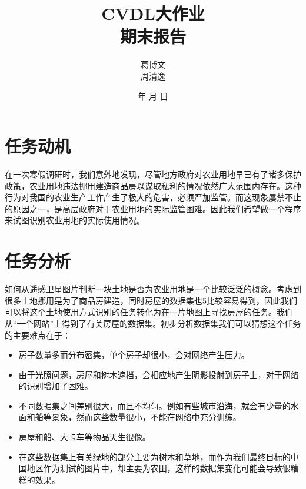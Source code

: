 \documentclass[a4paper,12pt]{article}
\renewcommand{\today}{\number\year 年 \number\month 月 \number\day 日}
\begin{document}
\begin{CJK*}{UTF8}{gbsn}

\title{\textbf{CVDL大作业\\期末报告}}
\author{葛博文\\周清逸}
\date{\today}
\maketitle

\begin{spacing}{1.2}

    \section{任务动机}
    在一次寒假调研时，我们意外地发现，尽管地方政府对农业用地早已有了诸多保护政策，农业用地违法挪用建造商品房以谋取私利的情况依然广大范围内存在。这种行为对我国的农业生产工作产生了极大的危害，必须严加监管。而这现象屡禁不止的原因之一，是高层政府对于农业用地的实际监管困难。因此我们希望做一个程序来试图识别农业用地的实际使用情况。


    \section{任务分析}
    如何从遥感卫星图片判断一块土地是否为农业用地是一个比较泛泛的概念。考虑到很多土地挪用是为了商品房建造，同时房屋的数据集也5比较容易得到，因此我们可以将这个土地使用方式识别的任务转化为在一片地图上寻找房屋的任务。我们从“一个网站”上得到了有关房屋的数据集\cite{maggiori2017dataset}。初步分析数据集我们可以猜想这个任务的主要难点在于：
    \begin{itemize}
        \item 房子数量多而分布密集，单个房子却很小，会对网络产生压力。
        \item 由于光照问题，房屋和树木遮挡，会相应地产生阴影投射到房子上，对于网络的识别增加了困难。
        \item 不同数据集之间差别很大，而且不均匀。例如有些城市沿海，就会有少量的水面和船等景象，然而这些数量很小，不能在网络中充分训练。
        \item 房屋和船、大卡车等物品天生很像。
        \item 在这些数据集上有关绿地的部分主要为树木和草地，而作为我们最终目标的中国地区作为测试的图片中，却主要为农田，这样的数据集变化可能会导致很糟糕的效果。
    \end{itemize}




\end{spacing}
\end{CJK*}
\end{document}
